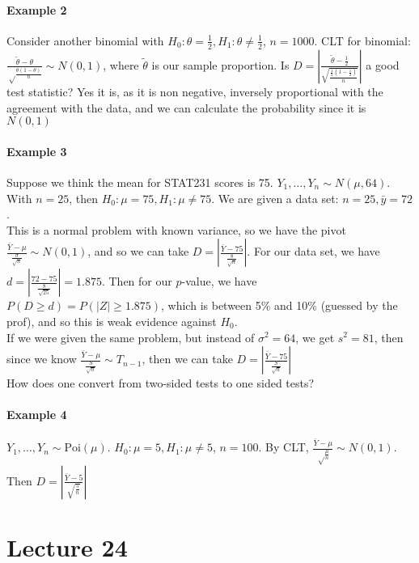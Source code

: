 \documentclass[10pt,letter]{article}
\theoremstyle{plain}
\theoremstyle{definition}
\begin{document}
\paragraph{Example 2}
Consider another binomial with $H_0:\theta=\frac{1}{2},H_1:\theta\neq\frac{1}{2}$, $n=1000$. CLT for binomial: $\frac{\tilde{\theta}-\theta}{\sqrt\frac{\theta(1-\theta)}{n}}\sim N(0,1)$, where $\tilde{\theta}$ is our sample proportion. Is $D=\left|\frac{\tilde{\theta}-\frac{1}{2}}{\sqrt{\frac{\frac{1}{2}(1-\frac{1}{2})}{n}}}\right|$ a good test statistic? Yes it is, as it is non negative, inversely proportional with the agreement with the data, and we can calculate the probability since it is $N(0,1)$ 
\paragraph{Example 3}
Suppose we think the mean for STAT231 scores is 75. $Y_1,\ldots,Y_n\sim N(\mu,64)$. With $n=25$, then $H_0:\mu=75,H_1:\mu\neq75$. We are given a data set: $n=25,\bar{y}=72$. \\ 
This is a normal problem with known variance, so we have the pivot $\frac{\bar{Y}-\mu}{\frac{\sigma}{\sqrt{n}}}\sim N(0,1)$, and so we can take $D=\left|\frac{\bar{Y}-75}{\frac{8}{\sqrt{n}}}\right|$. For our data set, we have $d=\left|\frac{72-75}{\frac{8}{\sqrt{25}}}\right|=1.875$. Then for our $p$-value, we have $P(D\geq d)=P(|Z|\geq 1.875)$, which is between 5\% and 10\% (guessed by the prof), and so this is weak evidence against $H_0$. \\ 
If we were given the same problem, but instead of $\sigma^2=64$, we get $s^2=81$, then since we know $\frac{\bar{Y}-\mu}{\frac{S}{\sqrt{n}}}\sim T_{n-1}$, then we can take $D=\left|\frac{\bar{Y}-75}{\frac{S}{\sqrt{n}}}\right|$\\ 
How does one convert from two-sided tests to one sided tests?
\paragraph{Example 4}
$Y_1,\ldots,Y_n\sim\text{Poi}(\mu)$. $H_0:\mu=5,H_1:\mu\neq5$, $n=100$. By CLT, $\frac{\bar{Y}-\mu}{\sqrt\frac{\mu}{n}}\sim N(0,1)$. Then $D=\left|\frac{\bar{Y}-5}{\sqrt{\frac{5}{n}}}\right|$

\section*{Lecture 24}
\end{document}
